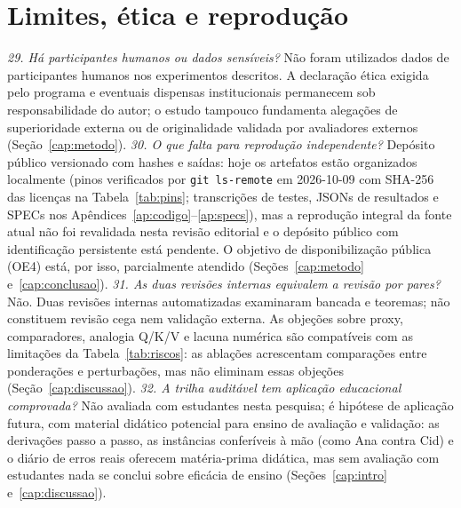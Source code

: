 \section{Limites, ética e reprodução}
\textit{29. Há participantes humanos ou dados sensíveis?} Não foram utilizados dados de participantes humanos nos experimentos descritos. A declaração ética exigida pelo programa e eventuais dispensas institucionais permanecem sob responsabilidade do autor; o estudo tampouco fundamenta alegações de superioridade externa ou de originalidade validada por avaliadores externos (Seção~\ref{cap:metodo}).
\textit{30. O que falta para reprodução independente?} Depósito público versionado com hashes e saídas: hoje os artefatos estão organizados localmente (pinos verificados por \texttt{git ls-remote} em 2026-10-09 com SHA-256 das licenças na Tabela~\ref{tab:pins}; transcrições de testes, JSONs de resultados e SPECs nos Apêndices~\ref{ap:codigo}--\ref{ap:specs}), mas a reprodução integral da fonte atual não foi revalidada nesta revisão editorial e o depósito público com identificação persistente está pendente. O objetivo de disponibilização pública (OE4) está, por isso, parcialmente atendido (Seções~\ref{cap:metodo} e~\ref{cap:conclusao}).
\textit{31. As duas revisões internas equivalem a revisão por pares?} Não. Duas revisões internas automatizadas examinaram bancada e teoremas; não constituem revisão cega nem validação externa. As objeções sobre proxy, comparadores, analogia Q/K/V e lacuna numérica são compatíveis com as limitações da Tabela~\ref{tab:riscos}: as ablações acrescentam comparações entre ponderações e perturbações, mas não eliminam essas objeções (Seção~\ref{cap:discussao}).
\textit{32. A trilha auditável tem aplicação educacional comprovada?} Não avaliada com estudantes nesta pesquisa; é hipótese de aplicação futura, com material didático potencial para ensino de avaliação e validação: as derivações passo a passo, as instâncias conferíveis à mão (como Ana contra Cid) e o diário de erros reais oferecem matéria-prima didática, mas sem avaliação com estudantes nada se conclui sobre eficácia de ensino (Seções~\ref{cap:intro} e~\ref{cap:discussao}).
